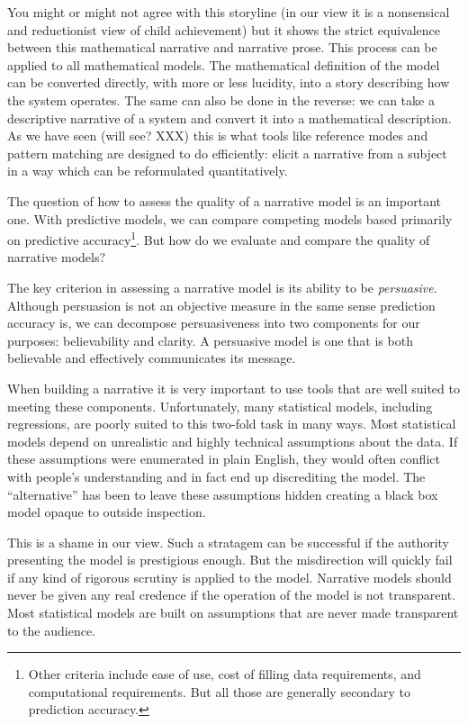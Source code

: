 \documentclass[]{memoir}
\begin{document}
You might or might not agree with this storyline (in our view it is a
nonsensical and reductionist view of child achievement) but it shows the
strict equivalence between this mathematical narrative and narrative
prose. This process can be applied to all mathematical models. The
mathematical definition of the model can be converted directly, with
more or less lucidity, into a story describing how the system operates.
The same can also be done in the reverse: we can take a descriptive
narrative of a system and convert it into a mathematical description. As
we have seen (will see? XXX) this is what tools like reference modes and
pattern matching are designed to do efficiently: elicit a narrative from
a subject in a way which can be reformulated quantitatively.

The question of how to assess the quality of a narrative model is an
important one. With predictive models, we can compare competing models
based primarily on predictive accuracy\footnote{Other criteria include
  ease of use, cost of filling data requirements, and computational
  requirements. But all those are generally secondary to prediction
  accuracy.}. But how do we evaluate and compare the quality of
narrative models?

The key criterion in assessing a narrative model is its ability to be
\emph{persuasive}. Although persuasion is not an objective measure in
the same sense prediction accuracy is, we can decompose persuasiveness
into two components for our purposes: believability and clarity. A
persuasive model is one that is both believable and effectively
communicates its message.

When building a narrative it is very important to use tools that are
well suited to meeting these components. Unfortunately, many statistical
models, including regressions, are poorly suited to this two-fold task
in many ways. Most statistical models depend on unrealistic and highly
technical assumptions about the data. If these assumptions were
enumerated in plain English, they would often conflict with people's
understanding and in fact end up discrediting the model. The
``alternative'' has been to leave these assumptions hidden creating a
black box model opaque to outside inspection.

This is a shame in our view. Such a stratagem can be successful if the
authority presenting the model is prestigious enough. But the
misdirection will quickly fail if any kind of rigorous scrutiny is
applied to the model. Narrative models should never be given any real
credence if the operation of the model is not transparent. Most
statistical models are built on assumptions that are never made
transparent to the audience.
\end{document}

